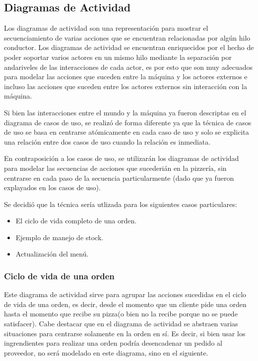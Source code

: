 \documentclass[a4paper,10pt]{article}
\begin{document}
\newpage

\subsection*{Diagramas de Actividad}


Los diagramas de actividad son una representaci\'on para mostrar el secuenciamiento de varias acciones que se encuentran relacionadas por alg\'un
hilo conductor. Los diagramas de actividad se encuentran enriquecidos por el hecho de poder soportar varios actores en un mismo hilo mediante la 
separaci\'on por andariveles de las interacciones de cada actor, es por esto que son muy adecuados para modelar las acciones que suceden entre la
m\'aquina y los actores externos e incluso las acciones que suceden entre los actores externos sin interacci\'on con la m\'aquina.

Si bien las interacciones entre el mundo y la m\'aquina ya fueron descriptas en el diagrama de casos de uso, se realiz\'o de forma diferente
ya que la t\'ecnica de casos de uso se basa en centrarse at\'omicamente en cada caso de uso y solo se explicita una relaci\'on entre dos casos de
uso cuando la relaci\'on es inmediata.

En contraposici\'on a los casos de uso, se utilizar\'an los diagramas de actividad para modelar las secuencias de acciones que sucederi\'an en la 
pizzer\'ia, sin centrarse en cada paso de la secuencia particularmente (dado que ya fueron explayados en los casos de uso).

Se decidi\'o que la t\'ecnica ser\'ia utlizada para los siguientes casos particulares:

\begin{itemize}
\item El ciclo de vida completo de una orden.
\item Ejemplo de manejo de stock.
\item Actualizaci\'on del men\'u.
\end{itemize}


\subsubsection*{Ciclo de vida de una orden}

Este diagrama de actividad sirve para agrupar las acciones sucedidas en el ciclo de vida de una orden, es decir, desde el momento que un cliente
pide una orden hasta el momento que recibe su pizza(o bien no la recibe porque no se puede satisfacer). Cabe destacar que en el diagrama de actividad
se abstraen varias situaciones para centrarse solamente en la orden en s\'i. Es decir, si bien usar los ingrendientes para realizar una orden podr\'ia
desencadenar un pedido al proveedor, no ser\'a modelado en este diagrama, sino en el siguiente.
\end{document}
